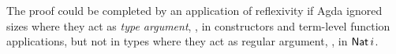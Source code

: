 \begin{code}%
\>[0]\AgdaSpace{}%
\AgdaSymbol{:}\AgdaSpace{}%
\AgdaSpace{}%
\AgdaSpace{}%
\AgdaSpace{}%
\AgdaSymbol{(}\AgdaSpace{}%
\AgdaSymbol{:}\AgdaSpace{}%
\AgdaSpace{}%
\AgdaSymbol{)}\AgdaSpace{}%
\AgdaSpace{}%
\AgdaSpace{}%
\AgdaSpace{}%
\AgdaSpace{}%
\AgdaSpace{}%
\AgdaSpace{}%
\AgdaSpace{}%
\AgdaSpace{}%
\<%
\\
\>[0]\AgdaSpace{}%
\AgdaSpace{}%
\AgdaFunction{+}\AgdaSpace{}%
\AgdaSymbol{)}\AgdaSpace{}%
\AgdaSymbol{(}\AgdaSpace{}%
\AgdaSymbol{)}%
\>[31]\AgdaSymbol{=}%
\>[34]%
\>[57]\<%
\\
\>[0]\AgdaSpace{}%
\AgdaSpace{}%
\AgdaFunction{+}\AgdaSpace{}%
\AgdaSymbol{)}\AgdaSpace{}%
\AgdaSymbol{(}\AgdaSpace{}%
\AgdaSpace{}%
\AgdaSymbol{)}%
\>[31]\AgdaSymbol{=}%
\>[34]\AgdaSpace{}%
\AgdaSpace{}%
\<%
\end{code}

The proof could be completed by an application of reflexivity if Agda
ignored sizes where they act as \emph{type argument}, \ie, in
constructors and term-level function applications, but not in types
where they act as regular argument, \eg, in $\aNat\,i$.
